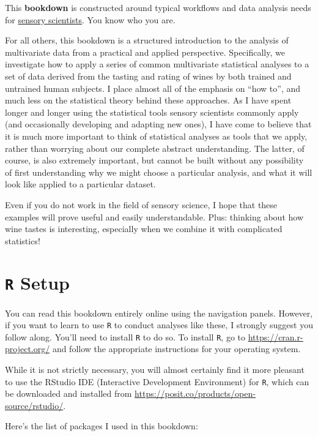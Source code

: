 \documentclass[
]{book}
\begin{document}
This \textbf{bookdown} is constructed around typical workflows and data analysis needs for \href{https://en.wikipedia.org/wiki/Sensory_analysis}{sensory scientists}. You know who you are.

For all others, this bookdown is a structured introduction to the analysis of multivariate data from a practical and applied perspective. Specifically, we investigate how to apply a series of common multivariate statistical analyses to a set of data derived from the tasting and rating of wines by both trained and untrained human subjects. I place almost all of the emphasis on ``how to'', and much less on the statistical theory behind these approaches. As I have spent longer and longer using the statistical tools sensory scientists commonly apply (and occasionally developing and adapting new ones), I have come to believe that it is much more important to think of statistical analyses as tools that we apply, rather than worrying about our complete abstract understanding. The latter, of course, is also extremely important, but cannot be built without any possibility of first understanding why we might choose a particular analysis, and what it will look like applied to a particular dataset.

Even if you do not work in the field of sensory science, I hope that these examples will prove useful and easily understandable. Plus: thinking about how wine tastes is interesting, especially when we combine it with complicated statistics!

\section*{\texorpdfstring{\texttt{R} Setup}{R Setup}}\label{r-setup}

You can read this bookdown entirely online using the navigation panels. However, if you want to learn to use \texttt{R} to conduct analyses like these, I strongly suggest you follow along. You'll need to install \texttt{R} to do so. To install \texttt{R}, go to \url{https://cran.r-project.org/} and follow the appropriate instructions for your operating system.

While it is not strictly necessary, you will almost certainly find it more pleasant to use the RStudio IDE (Interactive Development Environment) for \texttt{R}, which can be downloaded and installed from \url{https://posit.co/products/open-source/rstudio/}.

Here's the list of packages I used in this bookdown:
\end{document}
